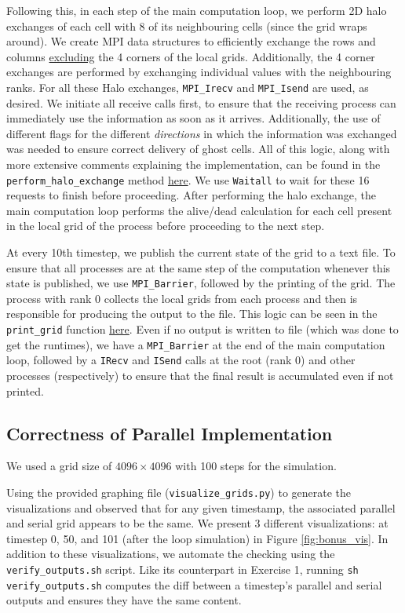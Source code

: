 \documentclass[a4paper,10pt]{article}
\begin{document}
Following this, in each step of the main computation loop, we perform 2D halo exchanges of each cell with 8 of its neighbouring cells (since the grid wraps around). We create MPI data structures to efficiently exchange the rows and columns \underline{excluding} the 4 corners of the local grids. Additionally, the 4 corner exchanges are performed by exchanging individual values with the neighbouring ranks. For all these Halo exchanges, \verb|MPI_Irecv| and \verb|MPI_Isend| are used, as desired. We initiate all receive calls first, to ensure that the receiving process can immediately use the information as soon as it arrives. Additionally, the use of different flags for the different \textit{directions} in which the information was exchanged was needed to ensure correct delivery of ghost cells. All of this logic, along with more extensive comments explaining the implementation, can be found in the \verb|perform_halo_exchange| method \href{https://github.com/paulmyr/DD2356-MethodsHPC/blob/master/4_mpi/bonus/life_parallel.c#L119}{here}. We use \verb|Waitall| to wait for these 16 requests to finish before proceeding. After performing the halo exchange, the main computation loop performs the alive/dead calculation for each cell present in the local grid of the process before proceeding to the next step.

At every 10th timestep, we publish the current state of the grid to a text file. To ensure that all processes are at the same step of the computation whenever this state is published, we use \verb|MPI_Barrier|, followed by the printing of the grid. The process with rank 0 collects the local grids from each process and then is responsible for producing the output to the file. This logic can be seen in the \verb|print_grid| function \href{https://github.com/paulmyr/DD2356-MethodsHPC/blob/master/4_mpi/bonus/life_parallel.c#L192}{here}. Even if no output is written to file (which was done to get the runtimes), we have a \verb|MPI_Barrier| at the end of the main computation loop, followed by a \verb|IRecv| and \verb|ISend| calls at the root (rank 0) and other processes (respectively) to ensure that the final result is accumulated even if not printed.  

\subsection{Correctness of Parallel Implementation}
We used a grid size of $4096 \times 4096$ with 100 steps for the simulation.

Using the provided graphing file (\verb|visualize_grids.py|) to generate the visualizations and observed that for any given timestamp, the associated parallel and serial grid appears to be the same. We present 3 different visualizations: at timestep 0, 50, and 101 (after the loop simulation) in Figure \ref{fig:bonus_vis}. In addition to these visualizations, we automate the checking using the \verb|verify_outputs.sh| script. Like its counterpart in Exercise 1, running \verb|sh verify_outputs.sh| computes the diff between a timestep's parallel and serial outputs and ensures they have the same content.
\end{document}
